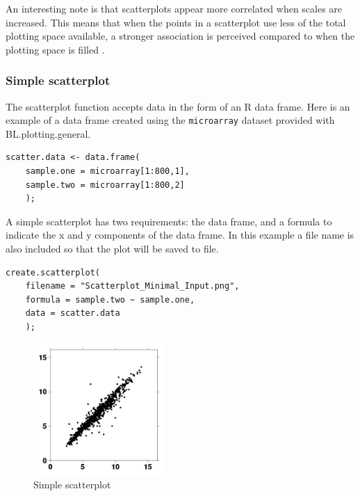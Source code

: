 \documentclass[letterpaper]{article}
\begin{document}
An interesting note is that scatterplots appear more correlated when scales are increased. This means that when the points in a scatterplot use less of the total plotting space available, a stronger association is perceived compared to when the plotting space is filled \cite{cleveland-scatter}.

\subsubsection{Simple scatterplot}
The scatterplot function accepts data in the form of an R  data frame. Here is an example of a data frame created using the \verb|microarray| dataset provided with BL.plotting.general.
\begin{verbatim}
scatter.data <- data.frame(
    sample.one = microarray[1:800,1],
    sample.two = microarray[1:800,2]
    );
\end{verbatim}

A simple scatterplot has two requirements: the data frame, and a formula to indicate the x and y components of the data frame. In this example a file name is also included so that the plot will be saved to file.
\begin{verbatim}
create.scatterplot(
    filename = "Scatterplot_Minimal_Input.png",
    formula = sample.two ~ sample.one,
    data = scatter.data
    );
\end{verbatim}
\begin{figure}[!ht]
  \begin{center}
     \includegraphics[width=50mm]{Figures/Scatterplot_Minimal_Input.png}
     \caption{Simple scatterplot}
  \end{center}
\end{figure}
\end{document}
